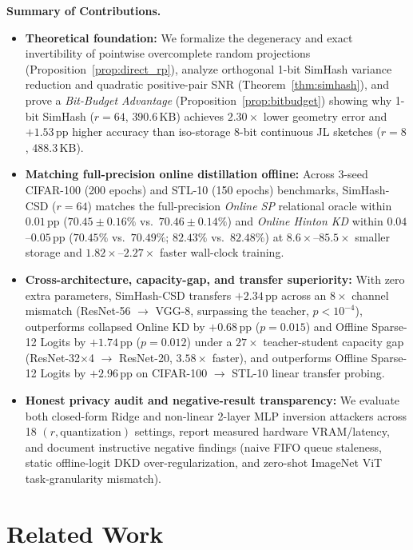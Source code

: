 \documentclass{article}
\begin{document}
\noindent\textbf{Summary of Contributions.}
\begin{itemize}
    \item \textbf{Theoretical foundation:} We formalize the degeneracy and exact invertibility of pointwise overcomplete random projections (Proposition~\ref{prop:direct_rp}), analyze orthogonal 1-bit SimHash variance reduction and quadratic positive-pair SNR (Theorem~\ref{thm:simhash}), and prove a \emph{Bit-Budget Advantage} (Proposition~\ref{prop:bitbudget}) showing why 1-bit SimHash ($r=64$, $390.6$\,KB) achieves $2.30\times$ lower geometry error and $+1.53$\,pp higher accuracy than iso-storage 8-bit continuous JL sketches ($r=8$, $488.3$\,KB).
    \item \textbf{Matching full-precision online distillation offline:} Across 3-seed CIFAR-100 (200 epochs) and STL-10 (150 epochs) benchmarks, SimHash-CSD ($r=64$) matches the full-precision \emph{Online SP} relational oracle within $0.01$\,pp ($70.45\pm0.16\%$ vs.\ $70.46\pm0.14\%$) and \emph{Online Hinton KD} within $0.04$--$0.05$\,pp ($70.45\%$ vs.\ $70.49\%$; $82.43\%$ vs.\ $82.48\%$) at $8.6\times$--$85.5\times$ smaller storage and $1.82\times$--$2.27\times$ faster wall-clock training.
    \item \textbf{Cross-architecture, capacity-gap, and transfer superiority:} With zero extra parameters, SimHash-CSD transfers $+2.34$\,pp across an $8\times$ channel mismatch (ResNet-56 $\to$ VGG-8, surpassing the teacher, $p<10^{-4}$), outperforms collapsed Online KD by $+0.68$\,pp ($p=0.015$) and Offline Sparse-12 Logits by $+1.74$\,pp ($p=0.012$) under a $27\times$ teacher-student capacity gap (ResNet-32$\times$4 $\to$ ResNet-20, $3.58\times$ faster), and outperforms Offline Sparse-12 Logits by $+2.96$\,pp on CIFAR-100 $\to$ STL-10 linear transfer probing.
    \item \textbf{Honest privacy audit and negative-result transparency:} We evaluate both closed-form Ridge and non-linear 2-layer MLP inversion attackers across 18 $(r,\text{quantization})$ settings, report measured hardware VRAM/latency, and document instructive negative findings (naive FIFO queue staleness, static offline-logit DKD over-regularization, and zero-shot ImageNet ViT task-granularity mismatch).
\end{itemize}

\section{Related Work}
\label{sec:related}
\end{document}
